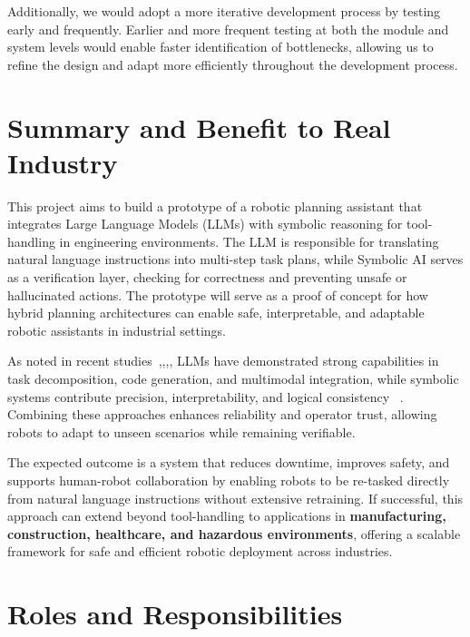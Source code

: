 \documentclass[12pt]{extarticle}
\begin{document}
Additionally, we would adopt a more iterative development process by testing early and frequently. Earlier and more frequent testing at both the module and system levels would enable faster identification of bottlenecks, allowing us to refine the design and adapt more efficiently throughout the development process.


\newpage
\section{Summary and Benefit to Real Industry}

This project aims to build a prototype of a robotic planning assistant that integrates Large Language Models (LLMs) with symbolic reasoning for tool-handling in engineering environments. The LLM is responsible for translating natural language instructions into multi-step task plans, while Symbolic AI serves as a verification layer, checking for correctness and preventing unsafe or hallucinated actions. The prototype will serve as a proof of concept for how hybrid planning architectures can enable safe, interpretable, and adaptable robotic assistants in industrial settings.

As noted in recent studies~\cite{enhancing-interpret},\cite{learning-neuro-symbolic},\cite{code-as-symbolic-planner},\cite{code-as-policies}, LLMs have demonstrated strong capabilities in task decomposition, code generation, and multimodal integration, while symbolic systems contribute precision, interpretability, and logical consistency ~\cite{code-as-symbolic-planner}. Combining these approaches enhances reliability and operator trust, allowing robots to adapt to unseen scenarios while remaining verifiable.

The expected outcome is a system that reduces downtime, improves safety, and supports human-robot collaboration by enabling robots to be re-tasked directly from natural language instructions without extensive retraining. If successful, this approach can extend beyond tool-handling to applications in \textbf{manufacturing, construction, healthcare, and hazardous environments}, offering a scalable framework for safe and efficient robotic deployment across industries.

\newpage
\section{Roles and Responsibilities}
\end{document}
